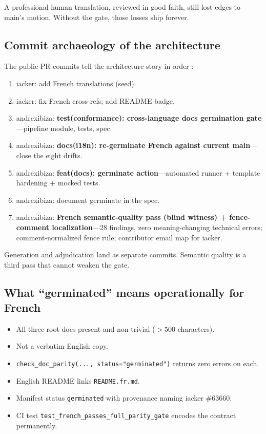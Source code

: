 \documentclass[11pt]{article}
\theoremstyle{definition}
\theoremstyle{plain}
\theoremstyle{remark}
\begin{document}
A professional human translation, reviewed in good faith, still lost edges
to main's motion. Without the gate, those losses ship forever.

\subsection{Commit archaeology of the architecture}

The public PR commits tell the architecture story in order
\citep{hermespr80391}:

\begin{enumerate}[leftmargin=*]
\item iacker: add French translations (seed).
\item iacker: fix French cross-refs; add README badge.
\item andrexibiza: \textbf{test(conformance): cross-language docs germination
  gate}---pipeline module, tests, spec.
\item andrexibiza: \textbf{docs(i18n): re-germinate French against current
  main}---close the eight drifts.
\item andrexibiza: \textbf{feat(docs): germinate action}---automated runner +
  template hardening + mocked tests.
\item andrexibiza: document germinate in the spec.
\item andrexibiza: \textbf{French semantic-quality pass (blind witness) +
  fence-comment localization}---28 findings, zero meaning-changing technical
  errors; comment-normalized fence rule; contributor email map for iacker.
\end{enumerate}

Generation and adjudication land as separate commits. Semantic quality is a
third pass that cannot weaken the gate.

\subsection{What ``germinated'' means operationally for French}

\begin{itemize}[leftmargin=*]
\item All three root docs present and non-trivial ($>500$ characters).
\item Not a verbatim English copy.
\item \texttt{check\_doc\_parity(..., status="germinated")} returns zero
  errors on each.
\item English README links \texttt{README.fr.md}.
\item Manifest status \texttt{germinated} with provenance naming iacker
  \#63660.
\item CI test \texttt{test\_french\_passes\_full\_parity\_gate} encodes the
  contract permanently.
\end{itemize}
\end{document}
